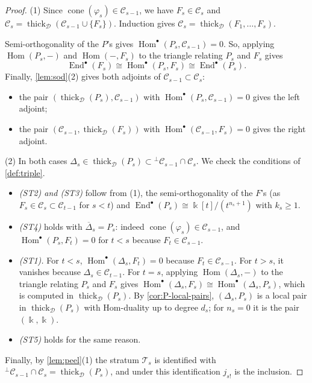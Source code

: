 \documentclass[11pt,reqno]{amsart}
\theoremstyle{plain}
\theoremstyle{definition}
\theoremstyle{remark}
\newcommand{\kk}{\Bbbk}
\DeclareMathOperator{\Hom}{Hom}
\DeclareMathOperator{\End}{End}
\DeclareMathOperator{\cone}{cone}
\newcommand{\thick}[2][\cD]{\operatorname{thick}_{#1}(#2)}
\newcommand{\Deltabar}{\overline{\Delta}}
\newcommand{\cD}{\mathcal{D}}
\newcommand{\cT}{\mathcal{T}}
\newcommand{\cC}{\mathcal{C}}
\begin{document}
\begin{proof}
(1) Since $\cone(\varphi_s)\in\cC_{s-1}$, we have $F_s\in\cC_s$ and $\cC_s=\thick{\cC_{s-1}\cup\{F_s\}}$. Induction gives $\cC_s=\thick{F_1,\dots,F_s}$.

Semi-orthogonality of the $P$'s gives $\Hom^\bullet(P_s,\cC_{s-1})=0$. So, applying $\Hom(P_s,-)$ and $\Hom(-,F_s)$ to the triangle relating $P_s$ and $F_s$ gives
\[\End^\bullet(F_s)\cong\Hom^\bullet(P_s,F_s)\cong\End^\bullet(P_s).\]
Finally, \cref{lem:sod}(2) gives both adjoints of $\cC_{s-1}\subset\cC_s$:
\begin{itemize}
\item the pair $(\thick{P_s},\cC_{s-1})$ with $\Hom^\bullet(P_s,\cC_{s-1})=0$ gives the left adjoint;
\item the pair $(\cC_{s-1},\thick{F_s})$ with $\Hom^\bullet(\cC_{s-1},F_s)=0$ gives the right adjoint.
\end{itemize}

(2) In both cases $\Delta_s\in\thick{P_s}\subset{}^\perp\cC_{s-1}\cap\cC_s$. We check the conditions of \cref{def:triple}.
\begin{itemize}
\item \emph{(ST2) and (ST3)} follow from (1), the semi-orthogonality of the $F$'s (as $F_s\in\cC_s\subset\cC_{t-1}$ for $s<t$) and $\End^\bullet(P_s)\cong\kk[t]/(t^{n_s+1})$ with $k_s\ge1$.
\item \emph{(ST4)} holds with $\Deltabar_s=P_s$: indeed $\cone(\varphi_s)\in\cC_{s-1}$, and $\Hom^\bullet(P_s,F_t)=0$ for $t<s$ because $F_t\in\cC_{s-1}$.
\item \emph{(ST1).} For $t<s$, $\Hom^\bullet(\Delta_s,F_t)=0$ because $F_t\in\cC_{s-1}$. For $t>s$, it vanishes because $\Delta_s\in\cC_{t-1}$. For $t=s$, applying $\Hom(\Delta_s,-)$ to the triangle relating $P_s$ and $F_s$ gives $\Hom^\bullet(\Delta_s,F_s)\cong\Hom^\bullet(\Delta_s,P_s)$, which is computed in $\thick{P_s}$. By \cref{cor:P-local-pairs}, $(\Delta_s,P_s)$ is a local pair in $\thick{P_s}$ with Hom-duality up to degree $d_s$; for $n_s=0$ it is the pair $(\kk,\kk)$.
\item \emph{(ST5)} holds for the same reason.
\end{itemize}
Finally, by \cref{lem:peel}(1) the stratum $\cT_s$ is identified with ${}^\perp\cC_{s-1}\cap\cC_s=\thick{P_s}$, and under this identification $j_{s!}$ is the inclusion.
\end{proof}
\end{document}
